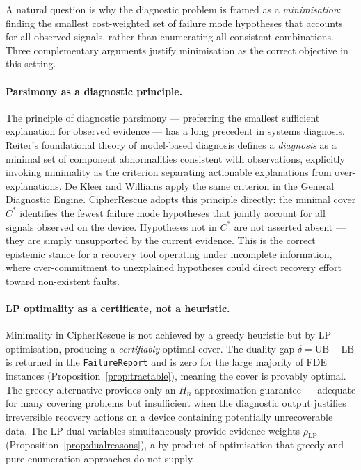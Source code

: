 \documentclass[11pt,a4paper]{report}
\begin{document}
A natural question is why the diagnostic problem is framed as a \emph{minimisation}: finding the smallest cost-weighted set of failure mode hypotheses that accounts for all observed signals, rather than enumerating all consistent combinations. Three complementary arguments justify minimisation as the correct objective in this setting.

\paragraph{Parsimony as a diagnostic principle.}
The principle of diagnostic parsimony --- preferring the smallest sufficient explanation for observed evidence --- has a long precedent in systems diagnosis. Reiter's foundational theory of model-based diagnosis \citep{reiter1987} defines a \emph{diagnosis} as a minimal set of component abnormalities consistent with observations, explicitly invoking minimality as the criterion separating actionable explanations from over-explanations. De Kleer and Williams \citep{dekleer1987} apply the same criterion in the General Diagnostic Engine. CipherRescue adopts this principle directly: the minimal cover $C^*$ identifies the fewest failure mode hypotheses that jointly account for all signals observed on the device. Hypotheses not in $C^*$ are not asserted absent --- they are simply unsupported by the current evidence. This is the correct epistemic stance for a recovery tool operating under incomplete information, where over-commitment to unexplained hypotheses could direct recovery effort toward non-existent faults.

\paragraph{LP optimality as a certificate, not a heuristic.}
Minimality in CipherRescue is not achieved by a greedy heuristic but by LP optimisation, producing a \emph{certifiably} optimal cover. The duality gap $\delta = \mathrm{UB} - \mathrm{LB}$ is returned in the \texttt{FailureReport} and is zero for the large majority of FDE instances (Proposition~\ref{prop:tractable}), meaning the cover is provably optimal. The greedy alternative \citep{vazirani2001} provides only an $H_n$-approximation guarantee \citep{karp1972} --- adequate for many covering problems but insufficient when the diagnostic output justifies irreversible recovery actions on a device containing potentially unrecoverable data. The LP dual variables simultaneously provide evidence weights $\rho_{\mathrm{LP}}$ (Proposition~\ref{prop:dualreasons}), a by-product of optimisation that greedy and pure enumeration approaches do not supply.
\end{document}
